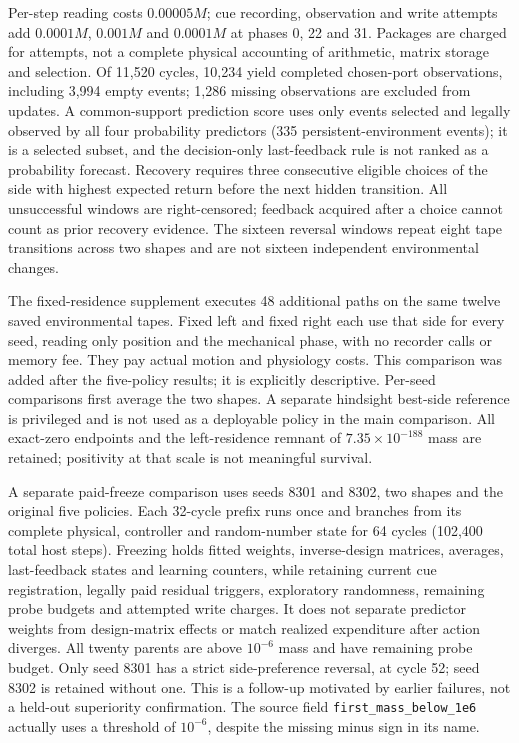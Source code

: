 Per-step reading costs $0.00005M$; cue recording, observation and write attempts add $0.0001M$, $0.001M$ and $0.0001M$ at phases 0, 22 and 31. Packages are charged for attempts, not a complete physical accounting of arithmetic, matrix storage and selection. Of 11,520 cycles, 10,234 yield completed chosen-port observations, including 3,994 empty events; 1,286 missing observations are excluded from updates. A common-support prediction score uses only events selected and legally observed by all four probability predictors (335 persistent-environment events); it is a selected subset, and the decision-only last-feedback rule is not ranked as a probability forecast. Recovery requires three consecutive eligible choices of the side with highest expected return before the next hidden transition. All unsuccessful windows are right-censored; feedback acquired after a choice cannot count as prior recovery evidence. The sixteen reversal windows repeat eight tape transitions across two shapes and are not sixteen independent environmental changes.

The fixed-residence supplement executes 48 additional paths on the same twelve saved environmental tapes. Fixed left and fixed right each use that side for every seed, reading only position and the mechanical phase, with no recorder calls or memory fee. They pay actual motion and physiology costs. This comparison was added after the five-policy results; it is explicitly descriptive. Per-seed comparisons first average the two shapes. A separate hindsight best-side reference is privileged and is not used as a deployable policy in the main comparison. All exact-zero endpoints and the left-residence remnant of $7.35\times10^{-188}$ mass are retained; positivity at that scale is not meaningful survival.

A separate paid-freeze comparison uses seeds 8301 and 8302, two shapes and the original five policies. Each 32-cycle prefix runs once and branches from its complete physical, controller and random-number state for 64 cycles (102,400 total host steps). Freezing holds fitted weights, inverse-design matrices, averages, last-feedback states and learning counters, while retaining current cue registration, legally paid residual triggers, exploratory randomness, remaining probe budgets and attempted write charges. It does not separate predictor weights from design-matrix effects or match realized expenditure after action diverges. All twenty parents are above $10^{-6}$ mass and have remaining probe budget. Only seed 8301 has a strict side-preference reversal, at cycle 52; seed 8302 is retained without one. This is a follow-up motivated by earlier failures, not a held-out superiority confirmation. The source field \texttt{first\_mass\_below\_1e6} actually uses a threshold of $10^{-6}$, despite the missing minus sign in its name.

